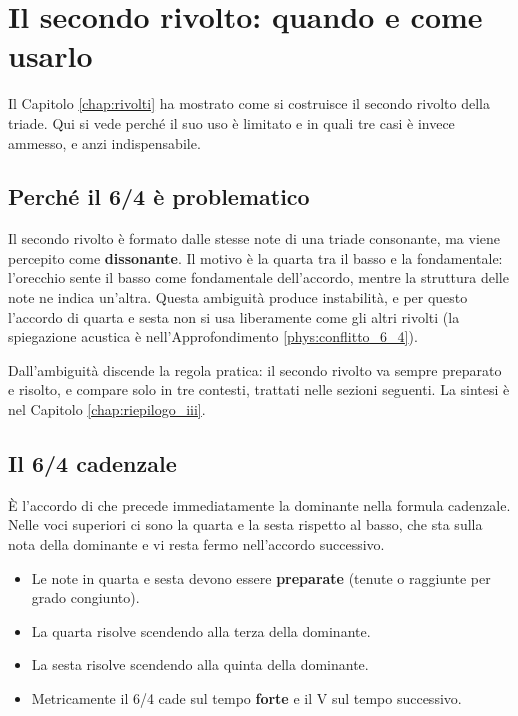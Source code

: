 \chapter{Il secondo rivolto: quando e come usarlo}
\label{chap:quarta_sesta}

Il Capitolo \ref{chap:rivolti} ha mostrato come si costruisce il secondo rivolto della triade. Qui si vede perché il suo uso è limitato e in quali tre casi è invece ammesso, e anzi indispensabile.

\section{Perché il 6/4 è problematico}
\label{sec:problema_secondo_rivolto}

Il secondo rivolto è formato dalle stesse note di una triade consonante, ma viene percepito come \textbf{dissonante}. Il motivo è la quarta tra il basso e la fondamentale: l'orecchio sente il basso come fondamentale dell'accordo, mentre la struttura delle note ne indica un'altra. Questa ambiguità produce instabilità, e per questo l'accordo di quarta e sesta non si usa liberamente come gli altri rivolti (la spiegazione acustica è nell'Approfondimento \ref{phys:conflitto_6_4}).

Dall'ambiguità discende la regola pratica: il secondo rivolto va sempre preparato e risolto, e compare solo in tre contesti, trattati nelle sezioni seguenti. La sintesi è nel Capitolo \ref{chap:riepilogo_iii}.

\section{Il 6/4 cadenzale}
\label{sec:cadenziale}

\begin{definizione}[6/4 cadenzale]
    È l'accordo di  che precede immediatamente la dominante nella formula cadenzale. Nelle voci superiori ci sono la quarta e la sesta rispetto al basso, che sta sulla nota della dominante e vi resta fermo nell'accordo successivo.
\end{definizione}

\begin{regola}
    \begin{itemize}
        \item Le note in quarta e sesta devono essere \textbf{preparate} (tenute o raggiunte per grado congiunto).
        \item La quarta risolve scendendo alla terza della dominante.
        \item La sesta risolve scendendo alla quinta della dominante.
        \item Metricamente il 6/4 cade sul tempo \textbf{forte} e il V sul tempo successivo.
    \end{itemize}
\end{regola}


